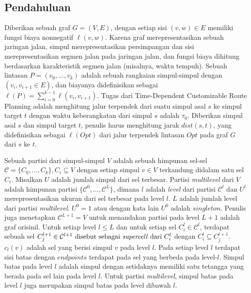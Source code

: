 \subsection{Pendahuluan}
\label{subsec:tdcrp-preliminaries}
Diberikan sebuah graf $G=(V,E)$, dengan setiap sisi $(v,w)\in E$ memiliki fungsi biaya nonnegatif $\ell(v,w)$. Karena graf merepresentasikan sebuah jaringan jalan, simpul merepresentasikan persimpangan dan sisi merepresentasikan segmen jalan pada jaringan jalan, dan fungsi biaya dihitung berdasarkan karakteristik segmen jalan (misalnya, waktu tempuh). Sebuah lintasan $P=(v_0,\ldots,v_k)$ adalah sebuah rangkaian simpul-simpul dengan $(v_i, v_{i+1}\in E)$, dan biayanya didefinisikan sebagai $\ell(P)=\sum_{i=0}^{k-1}\ell(v_i,v_{i+1})$. Tugas dari Time-Dependent Customizable Route Planning adalah menghitung  jalur terpendek dari suatu simpul asal $s$ ke simpul target $t$ dengan waktu keberangkatan dari simpul $s$ adalah $\tau_0$. Diberikan simpul asal $s$ dan simpul target $t$, penulis harus menghitung jarak $dist(s,t)$, yang didefinisikan sebagai $\ell(Opt)$ dari jalur terpendek lintasan $Opt$ pada graf $G$ dari $s$ ke $t$.

Sebuah partisi dari simpul-simpul $V$ adalah sebuah himpunan sel-sel $\mathcal{C}=\{C_0,\ldots, C_k\}, C_i\subseteq V$ dengan setiap simpul $v\in V$ terkandung didalam satu sel $C_i$. Misalkan $U$ adalah jumlah simpul dari sel terbesar. Partisi \textit{multilevel} dari $V$ adalah himpunan partisi $\{\mathcal{C}^{0},\ldots, \mathcal{C}^{L}\}$, dimana $l$ adalah \textit{level} dari partisi $\mathcal{C}^{l}$ dan $U^{l}$ merepresentasikan ukuran dari sel terbesar pada level $l$. $L$ adalah jumlah level dari  partisi \textit{multilevel}. $U^{0}=1$ atau dengan kata lain $U^{0}$ adalah $singleton$. Penulis juga menetapkan $\mathcal{C}^{L+1}=V$ untuk menandakan partisi pada level $L+1$ adalah graf orisinil. Untuk setiap level $l\leq L$ dan untuk setiap sel $C_{i}^{l}\in\mathcal{C}^l$, terdapat sebuah sel $C_{j}^{l+1}\in\mathcal{C}^{l+1} \text{ disebut sebagai \textit{supercell} dari } C_i^l$ dengan $C_i^l\subseteq C_j^{l+1}$. $c_l(v)$ adalah sel yang berisi simpul $v$ pada level $l$. Pada setiap level $l$ terdapat sisi batas dengan $endpoints$ terdapat pada sel yang berbeda pada level-$l$. Simpul batas pada level $l$ adalah simpul dengan setidaknya memiliki satu tetangga yang berada pada sel lain pada level $l$.  Untuk partisi \textit{multilevel}, simpul batas pada level $l$ juga merupakan simpul batas pada level dibawah $l$.

